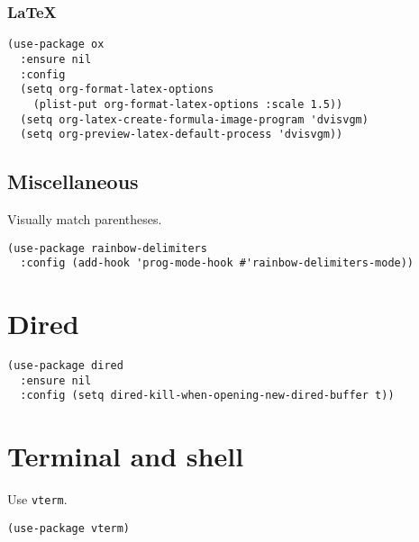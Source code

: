 \documentclass[a4paper,11pt]{article}
\begin{document}
\subsubsection{\LaTeX{}}
\label{sec:org6358734}
\begin{verbatim}
(use-package ox
  :ensure nil
  :config
  (setq org-format-latex-options
	(plist-put org-format-latex-options :scale 1.5))
  (setq org-latex-create-formula-image-program 'dvisvgm)
  (setq org-preview-latex-default-process 'dvisvgm))
\end{verbatim}

\subsection{Miscellaneous}
\label{sec:orge3bcbe1}
Visually match parentheses.
\begin{verbatim}
(use-package rainbow-delimiters
  :config (add-hook 'prog-mode-hook #'rainbow-delimiters-mode))
\end{verbatim}

\section{Dired}
\label{sec:orge3c6c5c}
\begin{verbatim}
(use-package dired
  :ensure nil
  :config (setq dired-kill-when-opening-new-dired-buffer t))
\end{verbatim}

\section{Terminal and shell}
\label{sec:org110a8c0}
Use \texttt{vterm}.
\begin{verbatim}
(use-package vterm)
\end{verbatim}
\end{document}
